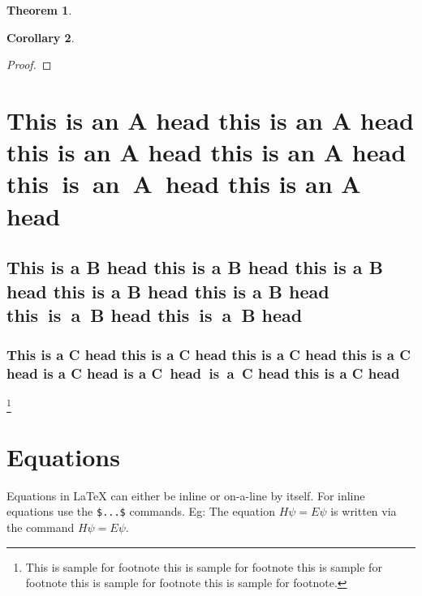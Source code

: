 \documentclass{CUP-JNL-NMJ}%
\theoremstyle{cupplain}
\newtheorem{theorem}{Theorem}[section]
\newtheorem{corollary}[theorem]{Corollary}
\theoremstyle{cupremark}
\theoremstyle{cupdefinition}
\theoremstyle{cupproof}
\newtheorem*{proof}{Proof}
\numberwithin{equation}{section}
\begin{document}
\begin{theorem}\label{theorem1}\lipsum[11]\end{theorem}

\lipsum[12]

\begin{corollary}\label{corollary1}\lipsum[13]\end{corollary}

\begin{proof}\lipsum[14]\end{proof}

\section[This is an A Head]{This is an A head this is an A head this is an A head this is an A head  this~is~an~A~head this is an A head}
\lipsum[15]

\subsection{This is a B head this is a B head this is a B head this is a B head this is a B head this~is~a~B head this~is~a~B head}
\lipsum[16]

\subsubsection{This is a C head this is a C head this is a C head this is a C head is a C head is a C~head~is~a~C head this is a C head}
\lipsum[2]\footnote{This is sample for footnote this is sample for footnote this is sample for footnote  this is sample for footnote this is sample for footnote.}

\section{Equations}

Equations in \LaTeX{} can either be inline or on-a-line by itself. For
inline equations use the \verb+$...$+ commands. Eg: The equation
$H\psi = E \psi$ is written via the command $H \psi = E \psi$.
\end{document}
